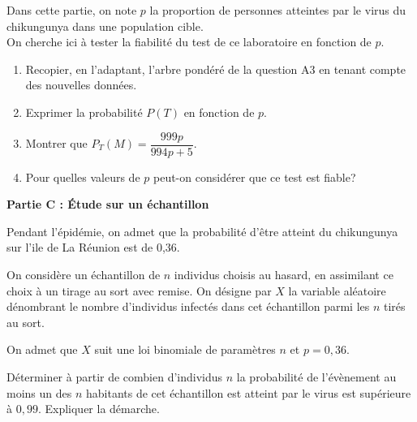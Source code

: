 \documentclass[10pt]{article}
\begin{document}
Dans cette partie, on note $p$ la proportion de personnes atteintes par le virus du chikungunya dans une population cible.\\
On cherche ici à tester la fiabilité du test de ce laboratoire en fonction de $p$.

\begin{enumerate}
\item Recopier, en l'adaptant, l'arbre pondéré de la question A3 en tenant compte des nouvelles données.
\item Exprimer la probabilité $P(T)$ en fonction de $p$.
\item Montrer que $P_{T}(M) = \dfrac{999 p}{994 p+5}$.
\item Pour quelles valeurs de $p$ peut-on considérer que ce test est fiable?
\end{enumerate}

\textbf{Partie C : Étude sur un échantillon}

\medskip

Pendant l'épidémie, on admet que la probabilité d'être atteint du chikungunya sur l'ile de La Réunion est de 0,36.

On considère un échantillon de $n$ individus choisis au hasard, en assimilant ce choix à un tirage au sort avec remise. On désigne par $X$ la variable aléatoire dénombrant le nombre d'individus infectés dans cet échantillon parmi les $n$ tirés au sort.

On admet que $X$ suit une loi binomiale de paramètres $n$ et $p=0,36$.


Déterminer à partir de combien d'individus $n$ la probabilité de l'évènement \og au moins un des $n$ habitants de cet échantillon est atteint par le virus \fg est supérieure à $0,99$. Expliquer la démarche.

\bigskip
\end{document}

